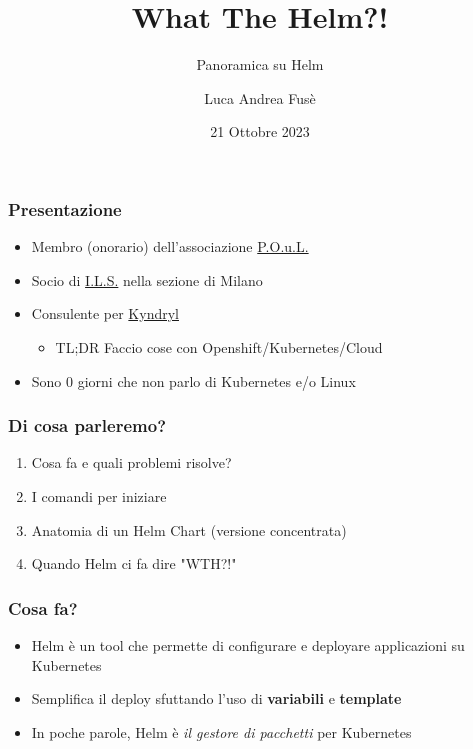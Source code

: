 \documentclass{beamer}
\title{What The Helm?!}
\subtitle{Panoramica su Helm}
\author{Luca Andrea Fusè}
\date{21 Ottobre 2023}
\begin{document}
\renewcommand{\CancelColor}{\color{red}}

\begin{frame}
    \titlepage
\end{frame}
 
 \begin{frame}
     \frametitle{Presentazione}

    \begin{itemize}
        \item Membro (onorario) dell'associazione \href{https://www.poul.org}{P.O.u.L.}
        \item Socio di \href{https://www.ils.org}{I.L.S.} nella sezione di Milano
        \item Consulente per \href{https://www.kyndryl.com}{Kyndryl}
        \begin{itemize}\item TL;DR Faccio cose con Openshift/Kubernetes/Cloud \end{itemize}
        \item Sono 0 giorni che non parlo di Kubernetes e/o Linux
    \end{itemize}
 \end{frame}
 
 \begin{frame}
   \frametitle{Di cosa parleremo?}
   \begin{enumerate}
    \item Cosa fa e quali problemi risolve?
    \item I comandi per iniziare
    \item Anatomia di un Helm Chart (versione concentrata)
    \item Quando Helm ci fa dire "WTH?!"
   
   \end{enumerate}
  \end{frame}

\begin{frame}
\frametitle{Cosa fa?}
 \begin{itemize}
    \item Helm è un tool che permette di configurare e deployare applicazioni su Kubernetes
    \item Semplifica il deploy sfuttando l'uso di \textbf{variabili} e \textbf{template}
    \item In poche parole, Helm è \textit{il gestore di pacchetti} per Kubernetes
  \end{itemize}
\end{frame}
\end{document}
